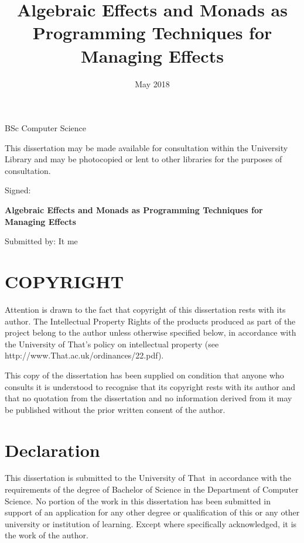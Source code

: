 \documentclass[a4paper,10pt]{article}
\title{Algebraic Effects and Monads as Programming Techniques for Managing Effects}
\author{\name}
\date{May 2018}
\newenvironment{spaced}[1]
  {\begin{minipage}[c]{\textwidth}\vspace{#1}}
  {\end{minipage}}
\theoremstyle{definition}
\newcommand\name{It me}
\newcommand\uni{That}
\begin{document}
\maketitle
\begin{center}
BSc Computer Science
\end{center}

\pagebreak
This dissertation may be made available for
consultation within the University Library and
may be photocopied or lent to other libraries for the purposes of consultation.

\begin{spaced}{5em}
Signed:
\end{spaced}

\pagebreak
  \thispagestyle{empty}
  \begin{spaced}{4em}
    \begin{center}
      \LARGE\textbf{Algebraic Effects and Monads as Programming Techniques for Managing Effects}
    \end{center}
  \end{spaced}
  \begin{spaced}{3em}
    \begin{center}
      Submitted by: \name
    \end{center}
  \end{spaced}
  \begin{spaced}{5em}
    \section*{COPYRIGHT}

    Attention is drawn to the fact that copyright of this dissertation rests
    with its author. The Intellectual Property Rights of the products
    produced as part of the project belong to the author unless otherwise specified
    below, in accordance with the University of \uni's policy on intellectual property
   (see http://www.\uni.ac.uk/ordinances/22.pdf).

    This copy of the dissertation has been supplied on condition that anyone
    who consults it is understood to recognise that its copyright rests with its
    author and that no quotation from the dissertation and no information
    derived from it may be published without the prior written consent of
    the author.

    \section*{Declaration}
    This dissertation is submitted to the University of \uni\ in accordance
    with the requirements of the degree of Bachelor of Science in the
    Department of Computer Science. No portion of the work in this dissertation
    has been submitted in support of an application for any other degree
    or qualification of this or any other university or institution of learning.
    Except where specifically acknowledged, it is the work of the author.
  \end{spaced}
\end{document}
